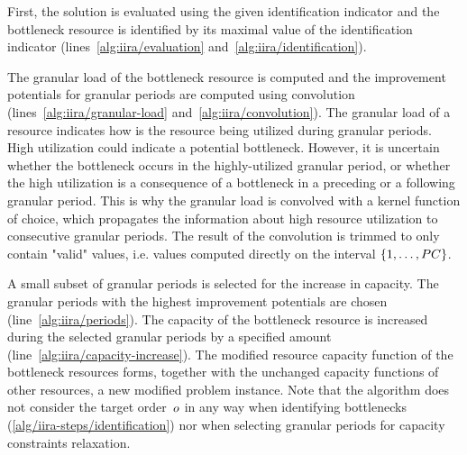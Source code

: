 \begin{steps}
    \item
    First, the solution is evaluated using the given identification indicator
    and the bottleneck resource is identified by its maximal value of the identification indicator
    (lines~\ref{alg:iira/evaluation} and~\ref{alg:iira/identification}).

    \item
    The granular load of the bottleneck resource is computed
    and the improvement potentials for granular periods are computed
    using convolution (lines~\ref{alg:iira/granular-load} and~\ref{alg:iira/convolution}).
    The granular load of a resource indicates how is the resource being utilized during granular periods.
    High utilization could indicate a potential bottleneck.
    However, it is uncertain whether the bottleneck occurs in the highly-utilized granular period,
    or whether the high utilization is a consequence of a bottleneck
    in a preceding or a following granular period.
    This is why the granular load is convolved with a kernel function of choice,
    which propagates the information about high resource utilization
    to consecutive granular periods.
    The result of the convolution is trimmed to only contain "valid" values,
    i.e. values computed directly on the interval $\{{1}, \dots, {PC}\}$.
    \label{alg/iira-steps/identification}

    \item
    A small subset of granular periods is selected for the increase in capacity.
    The granular periods with the highest improvement potentials are chosen (line~\ref{alg:iira/periods}).
    The capacity of the bottleneck resource is increased during the selected granular periods
    by a specified amount (line~\ref{alg:iira/capacity-increase}).
    The modified resource capacity function of the bottleneck resources forms,
    together with the unchanged capacity functions of other resources,
    a new modified problem instance.
    Note that the algorithm does not consider the target order~$o$ in any way
    when identifying bottlenecks (\cref{alg/iira-steps/identification})
    nor when selecting granular periods for capacity constraints relaxation.


\end{steps}
